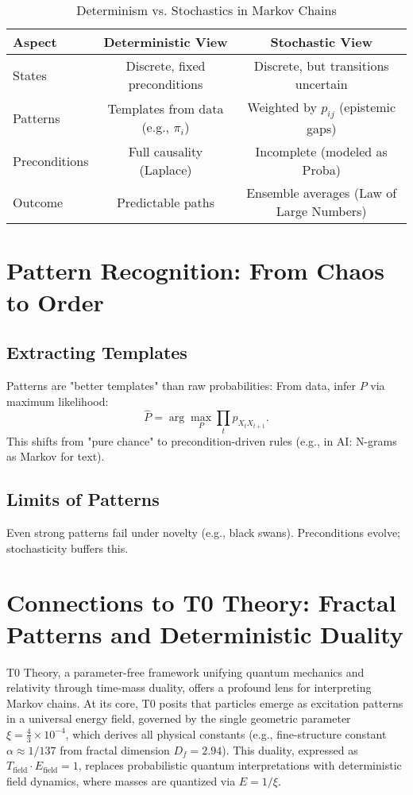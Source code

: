 \documentclass[12pt,a4paper]{article}
\begin{document}
	\begin{table}[h]
		\centering
		\begin{tabular}{lcc}
			\toprule
			\textbf{Aspect} & \textbf{Deterministic View} & \textbf{Stochastic View} \\
			\midrule
			States & Discrete, fixed preconditions & Discrete, but transitions uncertain \\
			Patterns & Templates from data (e.g., $\pi_i$) & Weighted by $p_{ij}$ (epistemic gaps) \\
			Preconditions & Full causality (Laplace) & Incomplete (modeled as Proba) \\
			Outcome & Predictable paths & Ensemble averages (Law of Large Numbers) \\
			\bottomrule
		\end{tabular}
		\caption{Determinism vs. Stochastics in Markov Chains}
		\label{tab:comparison}
	\end{table}
	
	\section{Pattern Recognition: From Chaos to Order}
	\label{sec:patterns}
	
	\subsection{Extracting Templates}
	Patterns are "better templates" than raw probabilities: From data, infer $P$ via maximum likelihood:
	\begin{equation}
		\hat{P} = \arg\max_P \prod_t p_{X_t X_{t+1}}.
	\end{equation}
	This shifts from "pure chance" to precondition-driven rules (e.g., in AI: N-grams as Markov for text).
	
	\subsection{Limits of Patterns}
	Even strong patterns fail under novelty (e.g., black swans). Preconditions evolve; stochasticity buffers this.
	
	\section{Connections to T0 Theory: Fractal Patterns and Deterministic Duality}
	\label{sec:t0-connection}
	
	T0 Theory, a parameter-free framework unifying quantum mechanics and relativity through time-mass duality, offers a profound lens for interpreting Markov chains. At its core, T0 posits that particles emerge as excitation patterns in a universal energy field, governed by the single geometric parameter $\xi = \frac{4}{3} \times 10^{-4}$, which derives all physical constants (e.g., fine-structure constant $\alpha \approx 1/137$ from fractal dimension $D_f = 2.94$). This duality, expressed as $T_{\text{field}} \cdot E_{\text{field}} = 1$, replaces probabilistic quantum interpretations with deterministic field dynamics, where masses are quantized via $E = 1/\xi$.
	
\end{document}
